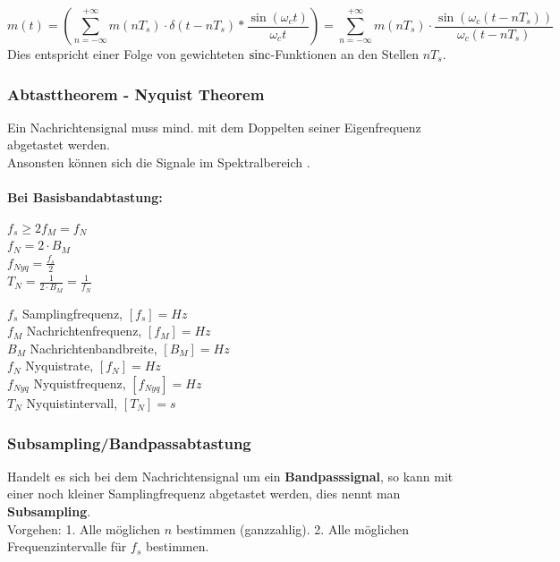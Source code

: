 \begin{equation*}
	m(t) = \left({\sum_{n=-\infty}^{+\infty}m(nT_s)\cdot\delta(t-nT_s)\ast\frac{\sin(\omega_ct)}{\omega_ct}}\right) = 
	\sum_{n=-\infty}^{+\infty}m(nT_s)\cdot\frac{\sin(\omega_c(t-nT_s))}{\omega_c(t-nT_s)}
\end{equation*}
Dies entspricht einer Folge von gewichteten $\operatorname{sinc}$-Funktionen an den Stellen $nT_s$.

\subsubsection{Abtasttheorem - Nyquist Theorem}
Ein Nachrichtensignal muss mind. mit dem Doppelten seiner Eigenfrequenz abgetastet werden. \\
Ansonsten können sich die Signale im Spektralbereich .  
\\ \\
\textbf{Bei Basisbandabtastung:}\\
\hspace*{3cm}
\begin{minipage}[t][2.0cm][c]{8cm}
	$ f_s \geq 2 f_M  = f_N$ \\
	$ f_N = 2 \cdot B_M $ \\
	$ f_{Nyq} = \frac{f_s}{2}$ \\
	$ T_N = \frac{1}{2\cdot B_M} = \frac{1}{f_N} $
\end{minipage}
\begin{minipage}[t][2.5cm][c]{10cm}
	$f_s$ Samplingfrequenz, $[f_s] = Hz$ \\
	$f_M$ Nachrichtenfrequenz, $[f_M] = Hz$ \\
	$B_M$ Nachrichtenbandbreite, $[B_M] = Hz$ \\
	$f_N$ Nyquistrate, $[f_N] = Hz$ \\
	$f_{Nyq}$ Nyquistfrequenz, $[f_{Nyq}] = Hz$ \\
	$T_N$ Nyquistintervall, $[T_N] = s$ \\	
\end{minipage}

\subsubsection{Subsampling/Bandpassabtastung}
Handelt es sich bei dem Nachrichtensignal um ein \textbf{Bandpasssignal}, so kann mit einer noch
kleiner Samplingfrequenz abgetastet werden, dies nennt man \textbf{Subsampling}. \\
Vorgehen: 1. Alle möglichen $n$ bestimmen (ganzzahlig). 2. Alle möglichen Frequenzintervalle für
$f_s$ bestimmen.

